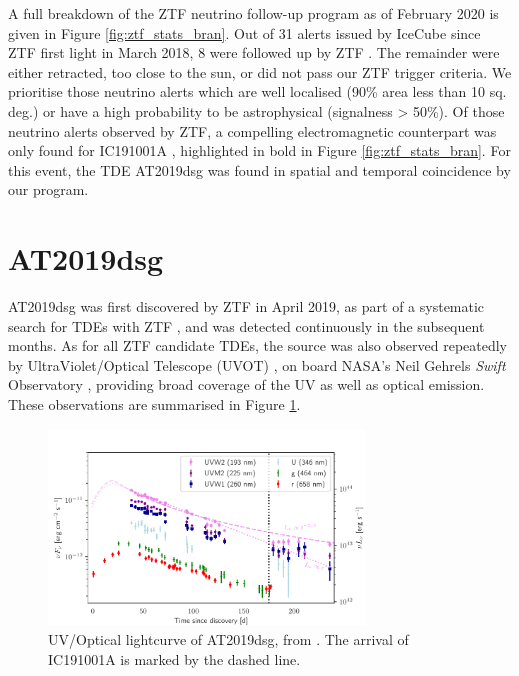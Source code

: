 \documentclass[a4paper,11pt]{article}
\begin{document}
A full breakdown of the ZTF neutrino follow-up program as of February 2020 is given in Figure \ref{fig:ztf_stats_bran}. Out of 31 alerts issued by IceCube since ZTF first light in March 2018, 8 were followed up by ZTF \cite{bran}. The remainder were either retracted, too close to the sun, or did not pass our ZTF trigger criteria. We prioritise those neutrino alerts which are well localised (90\% area less than 10 sq. deg.) or have a high probability to be astrophysical (signalness > 50\%). Of those neutrino alerts observed by ZTF, a compelling electromagnetic counterpart was only found for IC191001A \cite{bran}, highlighted in bold in Figure \ref{fig:ztf_stats_bran}. For this event, the TDE AT2019dsg was found in spatial and temporal coincidence by our program.

\section{AT2019dsg}

AT2019dsg was first discovered by ZTF in April 2019, as part of a systematic search for TDEs with ZTF \cite{van_velzen_20}, and was detected continuously in the subsequent months. As for all ZTF candidate TDEs, the source was also observed repeatedly by UltraViolet/Optical Telescope (UVOT) \cite{swift_uvot_05}, on board NASA's Neil Gehrels \textit{Swift} Observatory \cite{swift_04}, providing broad coverage of the UV as well as optical emission. These observations are summarised in Figure \ref{fig:bran_uv_opt}.

\begin{figure}[!ht]
	\centering
	\includegraphics[width=0.75\textwidth]{figures/uv_optical_lightcurve}
	\caption{UV/Optical lightcurve of AT2019dsg, from \cite{bran}. The arrival of IC191001A is marked by the dashed line.}
	\label{fig:bran_uv_opt}
\end{figure}
\end{document}
